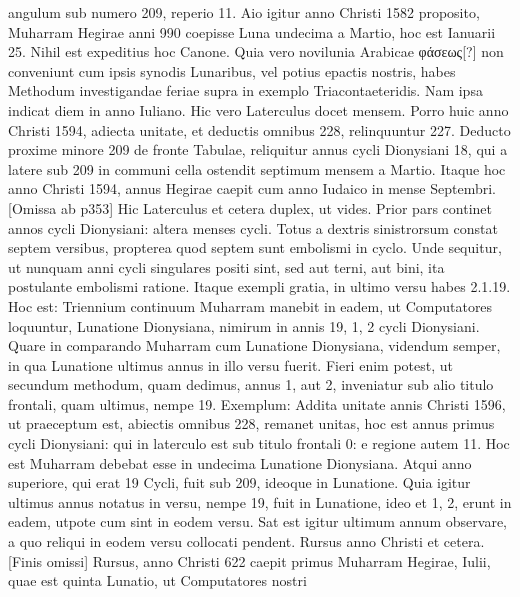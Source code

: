 angulum sub numero 209, reperio 11.
Aio igitur anno Christi
1582 proposito, Muharram Hegirae anni 990 coepisse Luna undecima
a Martio, hoc est Ianuarii 25.
Nihil est expeditius hoc Canone.
Quia vero novilunia Arabicae \textgreek{φάσεως[?]}
 non conveniunt cum ipsis
synodis Lunaribus, vel potius epactis nostris, habes Methodum investigandae
feriae supra in exemplo Triacontaeteridis.
Nam ipsa indicat
diem in anno Iuliano.
Hic vero Laterculus docet mensem.
Porro huic anno Christi 1594, adiecta unitate, et deductis omnibus
228, relinquuntur 227.
%
Deducto proxime minore 209 de fronte
Tabulae, reliquitur annus cycli Dionysiani 18, qui a latere sub 209
in communi cella ostendit septimum mensem a Martio.
Itaque hoc
anno Christi 1594, annus Hegirae caepit cum anno Iudaico in mense
Septembri.
[Omissa ab p353]
Hic Laterculus et cetera duplex, ut vides.
Prior pars continet annos cycli Dionysiani: altera menses cycli.
Totus
a dextris sinistrorsum constat septem versibus, propterea quod septem
sunt embolismi in cyclo.
Unde sequitur, ut nunquam anni cycli
singulares positi sint, sed aut terni, aut bini, ita postulante embolismi
ratione.
Itaque exempli gratia, in ultimo versu habes 2.1.19.
Hoc
est: Triennium continuum Muharram manebit in eadem, ut Computatores
loquuntur, Lunatione Dionysiana, nimirum in annis 19, 1, 2
cycli Dionysiani.
Quare in comparando Muharram cum Lunatione
Dionysiana, videndum semper, in qua Lunatione ultimus annus
in illo versu fuerit.
Fieri enim potest, ut secundum methodum,
quam dedimus, annus 1, aut 2, inveniatur sub alio titulo frontali, quam
ultimus, nempe 19.
Exemplum: Addita unitate annis Christi 1596,
ut praeceptum est, abiectis omnibus 228, remanet unitas, hoc est
annus primus cycli Dionysiani: qui in laterculo est sub titulo frontali
0: e regione autem 11.
Hoc est Muharram debebat esse in undecima
Lunatione Dionysiana.
Atqui anno superiore, qui erat 19 Cycli,
fuit sub 209, ideoque in  Lunatione.
Quia igitur ultimus annus
notatus in versu, nempe 19, fuit in  Lunatione, ideo et 1, 2,
erunt in eadem, utpote cum sint in eodem versu.
Sat est igitur ultimum
annum observare, a quo reliqui in eodem versu collocati pendent.
Rursus anno Christi et cetera.
[Finis omissi]
Rursus, anno Christi 622 caepit primus Muharram
Hegirae,  Iulii, quae est quinta Lunatio, ut Computatores nostri
